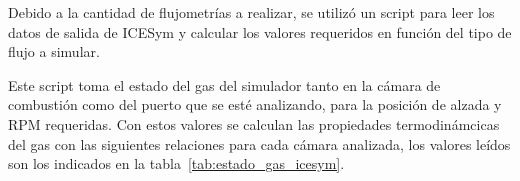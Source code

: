 

Debido a la cantidad de flujometrías a realizar, se utilizó un script para leer
los datos de salida de ICESym y calcular los valores requeridos en función del
tipo de flujo a simular.

Este script toma el estado del gas del simulador tanto en la cámara de
combustión como del puerto que se esté analizando, para la posición de alzada y
RPM requeridas.
%
Con estos valores se calculan las propiedades termodinámcicas del gas con las
siguientes relaciones para cada cámara analizada, los valores leídos son los
indicados en la tabla~\ref{tab:estado_gas_icesym}.

